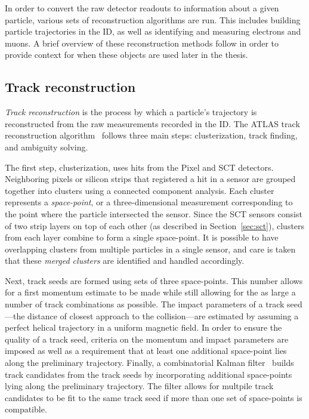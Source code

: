 In order to convert the raw detector readouts to information about a given particle, various sets of reconstruction algorithms are run.
This includes building particle trajectories in the ID, as well as identifying and measuring electrons and muons. %
A brief overview of these reconstruction methods follow in order to provide context for when these objects are used later in the thesis.

\subsection{Track reconstruction}\label{detector:track_reconstruction}
\emph{Track reconstruction} is the process by which a particle's trajectory is reconstructed from the raw measurements recorded in the ID.
The ATLAS track reconstruction algorithm~\cite{2017.atlas-track-reconstruction-run2} follows three main steps: clusterization, track finding, and ambiguity solving.

The first step, clusterization, uses hits from the Pixel and SCT detectors.
Neighboring pixels or silicon strips that registered a hit in a sensor are grouped together into clusters using a connected component analysis.
Each cluster represents a \emph{space-point}, or a three-dimensional measurement corresponding to the point where the particle intersected the sensor.
Since the SCT sensors consist of two strip layers on top of each other (as described in Section~\ref{sec:sct}), clusters from each layer combine to form a single space-point.
It is possible to have overlapping clusters from multiple particles in a single sensor, and care is taken that these \emph{merged clusters} are identified and handled accordingly.

Next, track seeds are formed using sets of three space-points.
This number allows for a first momentum estimate to be made while still allowing for the as large a number of track combinations as possible.
The impact parameters of a track seed---the distance of closest approach to the collision---are estimated by assuming a perfect helical trajectory in a uniform magnetic field.
In order to ensure the quality of a track seed, criteria on the momentum and impact parameters are imposed as well as a requirement that at least one additional space-point lies along the preliminary trajectory.
Finally, a combinatorial Kalman filter~\cite{1987.kalman-filtering} builds track candidates from the track seeds by incorporating additional space-points lying along the preliminary trajectory.
The filter allows for multpile track candidates to be fit to the same track seed if more than one set of space-points is compatible.

